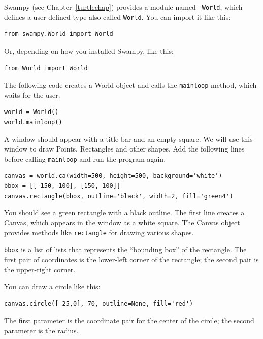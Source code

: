 \documentclass[10pt]{book}
\begin{document}
\begin{exercise}
\label{canvas}

Swampy (see Chapter~\ref{turtlechap}) provides a module named {\tt
  World}, which defines a user-defined type also called {\tt World}.
You can import it like this:

\begin{verbatim}
from swampy.World import World
\end{verbatim}

Or, depending on how you installed Swampy, like this:

\begin{verbatim}
from World import World
\end{verbatim}

The following code creates a World object and calls
the {\tt mainloop} method, which
waits for the user.

\begin{verbatim}
world = World()
world.mainloop()
\end{verbatim}

A window should appear with a title bar and an empty square.
We will use this window to draw Points,
Rectangles and other shapes.  
Add the following lines before calling
\verb"mainloop" and run the program again.

\begin{verbatim}
canvas = world.ca(width=500, height=500, background='white')
bbox = [[-150,-100], [150, 100]]
canvas.rectangle(bbox, outline='black', width=2, fill='green4')
\end{verbatim}

You should see a green rectangle with a black outline.
The first line creates a Canvas, which appears in the window
as a white square.  The Canvas object provides methods like
{\tt rectangle} for drawing various shapes.

{\tt bbox} is a list of lists that represents the ``bounding box''
of the rectangle.  The first pair of coordinates is the lower-left
corner of the rectangle; the second pair is the upper-right corner.

You can draw a circle like this:

\begin{verbatim}
canvas.circle([-25,0], 70, outline=None, fill='red')
\end{verbatim}

The first parameter is the coordinate pair for the center of the
circle; the second parameter is the radius.


\end{exercise}
\end{document}
